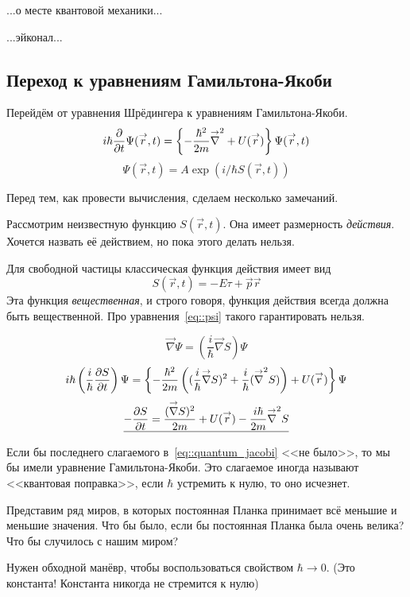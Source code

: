 ...о месте квантовой механики...

...эйконал...

\subsection{Переход к уравнениям Гамильтона-Якоби}
Перейдём от уравнения Шрёдингера к уравнениям Гамильтона-Якоби.
\def \nla{\nabla}
$$
    i \hbar \ud{}{t} \Psi(\vec r, t) = \left\{
        -\dfrac{\hbar^2}{2m} \vec \nla^2 + U(\vec r)
    \right\} \Psi(\vec r, t)
$$
\begin{equation}
    \Psi(\vec r, t) = A \exp(i/\hbar S(\vec r, t) )
    \label{eq::psi}
\end{equation}

Перед тем, как провести вычисления, сделаем несколько замечаний.

Рассмотрим неизвестную функцию $S(\vec r, t)$. Она имеет размерность \emph{действия}. Хочется назвать её действием, но пока этого делать нельзя. 

Для свободной частицы классическая функция действия имеет вид
$$
    S(\vec r, t) = -E \tau + \vec p \vec r
$$
Эта функция \emph{вещественная}, и строго говоря, функция действия всегда должна быть вещественной. Про уравнения~\eqref{eq::psi} такого гарантировать нельзя. 

$$
    \vec \nla \Psi = \left(
        \dfrac{i}{\hbar} \vec \nla S
    \right) \Psi
$$
$$
    i\hbar \left(
        \dfrac{i}{\hbar} \dfrac{\pd S}{\pd t}
    \right)\Psi = \left\{
        -\dfrac{\hbar^2}{2m} \left(
            (\dfrac{i}{\hbar} \vec \nla S)^2 + \dfrac{i}{\hbar} (\vec \nla^2 S)   
        \right) + U(\vec r) 
    \right\} \Psi
$$
\begin{equation}
\underline{
    -\dfrac{\pd S}{\pd t} = \dfrac{(\vec \nla S)^2}{2m} + U(\vec r) - \dfrac{i\hbar}{2m} \vec \nla^2 S
    }
    \label{eq::quantum_jacobi}
\end{equation}

Если бы последнего слагаемого в~\eqref{eq::quantum_jacobi} <<не было>>, то мы бы имели уравнение Гамильтона-Якоби. Это слагаемое иногда называют <<квантовая поправка>>, если $\hbar$ устремить к нулю, то оно исчезнет.

Представим ряд миров, в которых постоянная Планка принимает всё меньшие и меньшие значения. Что бы было, если бы постоянная Планка была очень велика? Что бы случилось с нашим миром?

Нужен обходной манёвр, чтобы воспользоваться свойством $\hbar \to 0$. (Это константа! Константа никогда не стремится к нулю)

